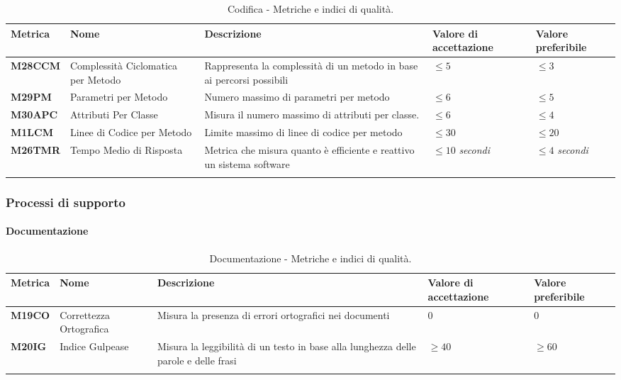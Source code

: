 \hspace{1pt}
    \begin{longtable}{|C{1.5cm}|L{3cm}|L{4cm}|L{2.5cm}|L{2.5cm}|}
        \hline
        \textbf{Metrica} & \textbf{Nome} & \textbf{Descrizione} & \textbf{Valore di accettazione} & \textbf{Valore preferibile} \\
        \hline
        \textbf{M28CCM} & Complessità Ciclomatica per Metodo & Rappresenta la complessità di un metodo in base ai percorsi possibili & $\leq 5$ & $\leq 3$ \\
        \hline
        \textbf{M29PM} & Parametri per Metodo & Numero massimo di parametri per metodo & $\leq 6$ & $\leq 5$ \\
        \hline
        \textbf{M30APC} & Attributi Per Classe & Misura il numero massimo di attributi per classe. & $\leq 6$ & $\leq 4$ \\
        \hline
        \textbf{M1LCM} & Linee di Codice per Metodo & Limite massimo di linee di codice per metodo & $\leq 30$ & $\leq 20$ \\
        \hline
        \textbf{M26TMR} & Tempo Medio di Risposta & Metrica che misura quanto è efficiente e reattivo un sistema software & $\leq 10$ \textit{secondi}  & $\leq 4$ \textit{secondi} \\
        \hline
    \caption{Codifica - Metriche e indici di qualità.}
    \label{tab:metriche}
\end{longtable}




\subsubsection{Processi di supporto}

\paragraph{Documentazione}
\hspace{1pt}
    \begin{longtable}{|C{1.5cm}|L{3cm}|L{4cm}|L{2.5cm}|L{2.5cm}|}
        \hline
        \textbf{Metrica} & \textbf{Nome} & \textbf{Descrizione} & \textbf{Valore di accettazione} & \textbf{Valore preferibile} \\
        \hline
        \textbf{M19CO} & Correttezza Ortografica & Misura la presenza di errori ortografici nei documenti & $0$ & $0$ \\
        \hline
        \textbf{M20IG} & Indice Gulpease & Misura la leggibilità di un testo in base alla lunghezza delle parole e delle frasi & $\geq 40$ & $\geq 60$ \\
        \hline
    \caption{Documentazione - Metriche e indici di qualità.}
    \label{tab:metriche_testo}
\end{longtable}

